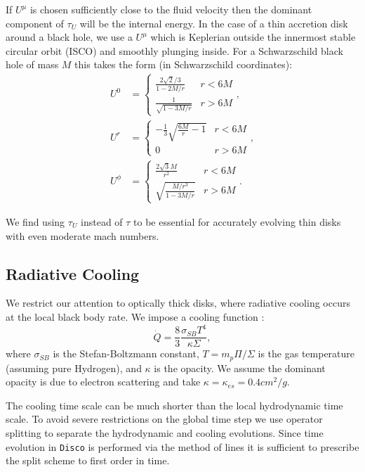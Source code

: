 \documentclass{emulateapj}
\newcommand{\sig}{\sigma}
\newcommand{\Sig}{\Sigma}
\newcommand{\ka}{\kappa}
\newcommand{\Disco}{{\texttt{Disco}}}
\begin{document}
If $U^\mu$ is chosen sufficiently close to the fluid velocity then the dominant component of $\tau_U$ will be the internal energy.  In the case of a thin accretion disk around a black hole, we use a $U^\mu$ which is Keplerian outside the innermost stable circular orbit (ISCO) and smoothly plunging inside.  For a Schwarzschild black hole of mass $M$ this takes the form (in Schwarzschild coordinates):
\begin{align}
	U^0 &= \left \{ \begin{matrix} \frac{2\sqrt{2}/3}{1-2M/r} & r < 6M \\
						\frac{1}{\sqrt{1-3M/r}} & r > 6M \end{matrix} \right . , \nonumber \\
	U^r &= \left \{ \begin{matrix} -\frac{1}{3}\sqrt{\frac{6M}{r}-1} & r < 6M \\
						0 & r > 6M \end{matrix} \right . , \nonumber \\
	U^\phi &= \left \{ \begin{matrix}  \frac{2 \sqrt{3} M}{r^2} & r < 6M \\
						\sqrt{\frac{M/r^3}{1-3M/r}} & r > 6M \end{matrix} \right . . \label{eq:Ugeo}
\end{align}


We find using $\tau_U$ instead of $\tau$ to be essential for accurately evolving thin disks with even moderate mach numbers.

\subsection{Radiative Cooling}
\label{subsec:cooling}

We restrict our attention to optically thick disks, where radiative cooling occurs at the local black body rate. We impose a cooling function \citep{Novikov73, FrankKingRaine}:
\begin{equation}
	\dot{Q} = \frac{8}{3} \frac{\sig_{SB} T^4}{\ka \Sig} , \label{eq:BBcooling}
\end{equation}
where $\sig_{SB}$ is the Stefan-Boltzmann constant, $T = m_p \Pi / \Sig$ is the gas temperature (assuming pure Hydrogen), and $\ka $ is the opacity.  We assume the dominant opacity is due to electron scattering and take $\ka = \ka_{es} = 0.4 cm^2/g$.

The cooling time scale can be much shorter than the local hydrodynamic time scale.  To avoid severe restrictions on the global time step we use operator splitting to separate the hydrodynamic and cooling evolutions.  Since time evolution in \Disco{} is performed via the method of lines it is sufficient to prescribe the split scheme to first order in time.
\end{document}
